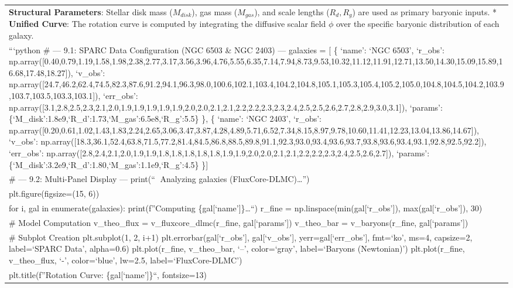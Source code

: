 \documentclass[
]{article}
\begin{document}
{\begin{longtable}[]{@{}
  >{\raggedright\arraybackslash}p{}@{}}
\textbf{Structural Parameters}: Stellar disk mass (\(M_{disk}\)), gas
mass (\(M_{gas}\)), and scale lengths (\(R_d, R_g\)) are used as primary
baryonic inputs. * \textbf{Unified Curve}: The rotation curve is
computed by integrating the diffusive scalar field \(\phi\) over the
specific baryonic distribution of each galaxy. \\
```python \# --- 9.1: SPARC Data Configuration (NGC 6503 \& NGC 2403)
--- galaxies = {[} \{ `name': `NGC 6503', `r\_obs':
np.array({[}0.40,0.79,1.19,1.58,1.98,2.38,2.77,3.17,3.56,3.96,4.76,5.55,6.35,7.14,7.94,8.73,9.53,10.32,11.12,11.91,12.71,13.50,14.30,15.09,15.89,16.68,17.48,18.27{]}),
`v\_obs':
np.array({[}24.7,46.2,62.4,74.5,82.3,87.6,91.2,94.1,96.3,98.0,100.6,102.1,103.4,104.2,104.8,105.1,105.3,105.4,105.2,105.0,104.8,104.5,104.2,103.9,103.7,103.5,103.3,103.1{]}),
`err\_obs':
np.array({[}3.1,2.8,2.5,2.3,2.1,2.0,1.9,1.9,1.9,1.9,1.9,2.0,2.0,2.1,2.1,2.2,2.2,2.3,2.3,2.4,2.5,2.5,2.6,2.7,2.8,2.9,3.0,3.1{]}),
`params': \{`M\_disk':1.8e9,`R\_d':1.73,`M\_gas':6.5e8,`R\_g':5.5\} \},
\{ `name': `NGC 2403', `r\_obs':
np.array({[}0.20,0.61,1.02,1.43,1.83,2.24,2.65,3.06,3.47,3.87,4.28,4.89,5.71,6.52,7.34,8.15,8.97,9.78,10.60,11.41,12.23,13.04,13.86,14.67{]}),
`v\_obs':
np.array({[}18.3,36.1,52.4,63.8,71.5,77.2,81.4,84.5,86.8,88.5,89.8,91.1,92.3,93.0,93.4,93.6,93.7,93.8,93.6,93.4,93.1,92.8,92.5,92.2{]}),
`err\_obs':
np.array({[}2.8,2.4,2.1,2.0,1.9,1.9,1.8,1.8,1.8,1.8,1.8,1.9,1.9,2.0,2.0,2.1,2.1,2.2,2.2,2.3,2.4,2.5,2.6,2.7{]}),
`params': \{`M\_disk':3.2e9,`R\_d':1.80,`M\_gas':1.1e9,`R\_g':4.5\}
\}{]} \\
\# --- 9.2: Multi-Panel Display --- print(``🚀 Analyzing galaxies
(FluxCore-DLMC)\ldots{}'') \\
plt.figure(figsize=(15, 6)) \\
for i, gal in enumerate(galaxies): print(f''Computing
\{gal{[}`name'{]}\}\ldots``) r\_fine =
np.linspace(min(gal{[}`r\_obs'{]}), max(gal{[}`r\_obs'{]}), 30) \\
\# Model Computation v\_theo\_flux = v\_fluxcore\_dlmc(r\_fine,
gal{[}`params'{]}) v\_theo\_bar = v\_baryons(r\_fine,
gal{[}`params'{]}) \\
\# Subplot Creation plt.subplot(1, 2, i+1)
plt.errorbar(gal{[}`r\_obs'{]}, gal{[}`v\_obs'{]},
yerr=gal{[}`err\_obs'{]}, fmt=`ko', ms=4, capsize=2, label=`SPARC Data',
alpha=0.6) plt.plot(r\_fine, v\_theo\_bar, `--', color=`gray',
label=`Baryons (Newtonian)') plt.plot(r\_fine, v\_theo\_flux, `-',
color=`blue', lw=2.5, label=`FluxCore-DLMC') \\
plt.title(f''Rotation Curve: \{gal{[}`name'{]}\}``, fontsize=13)

\end{longtable}}
\end{document}
